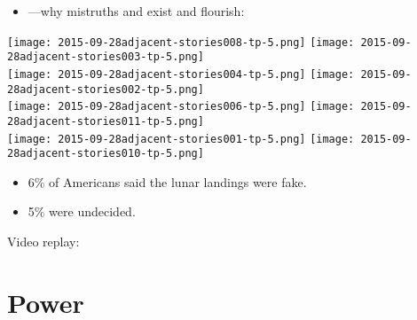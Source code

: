 \begin{frame}

  \begin{itemize}
  \item<1-> 
    ---why mistruths and 
     exist and flourish:
  \end{itemize}
  \centering
  \texttt{[image: 2015-09-28adjacent-stories008-tp-5.png]}
  \qquad\qquad
  \texttt{[image: 2015-09-28adjacent-stories003-tp-5.png]}\\
  \texttt{[image: 2015-09-28adjacent-stories004-tp-5.png]}
  \qquad\qquad
  \texttt{[image: 2015-09-28adjacent-stories002-tp-5.png]}\\
  \texttt{[image: 2015-09-28adjacent-stories006-tp-5.png]}
  \qquad\qquad
  \texttt{[image: 2015-09-28adjacent-stories011-tp-5.png]}\\
  \texttt{[image: 2015-09-28adjacent-stories001-tp-5.png]}
  \qquad\qquad
  \texttt{[image: 2015-09-28adjacent-stories010-tp-5.png]}

\end{frame}

\begin{frame}

  \begin{block}{
    }
    \begin{itemize}
    \item 
      6\% of Americans said the lunar landings were fake.
    \item 
      5\% were undecided.
    \end{itemize}
  \end{block}


  \begin{block}{Video replay:}
  \end{block}

\end{frame}

\section{Power}

